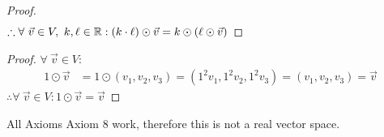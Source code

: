 \documentclass{article}
\begin{document}
\begin{enumerate}
\begin{proof}
\begin{align*}
        \end{align*}
        $\therefore \forall~\vec{v} \in V,~k,\ell \in \mathbb{R}: (k \cdot \ell) \odot \vec{v} = k \odot (\ell \odot \vec{v})$
    \end{proof}
    \begin{proof}
        $\forall~\vec{v} \in V$:
        \begin{align*}
            1 \odot \vec{v} & = 1 \odot (v_1,v_2,v_3) = (1^2v_1,1^2v_2,1^2v_3) = (v_1,v_2,v_3) = \vec{v}
        \end{align*}
        $\therefore \forall~\vec{v} \in V: 1 \odot \vec{v} = \vec{v}$
    \end{proof}
\end{enumerate}
All Axioms  Axiom 8 work, therefore this is not a real vector space.
\end{document}
